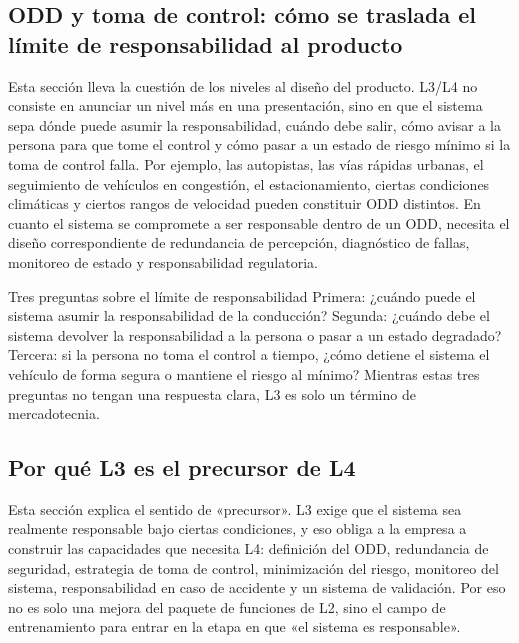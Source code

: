 \documentclass[a4paper]{article}
\begin{document}
\subsection{ODD y toma de control: cómo se traslada el límite de responsabilidad al producto}

Esta sección lleva la cuestión de los niveles al diseño del producto. L3/L4 no consiste en anunciar un nivel más en una presentación, sino en que el sistema sepa dónde puede asumir la responsabilidad, cuándo debe salir, cómo avisar a la persona para que tome el control y cómo pasar a un estado de riesgo mínimo si la toma de control falla. Por ejemplo, las autopistas, las vías rápidas urbanas, el seguimiento de vehículos en congestión, el estacionamiento, ciertas condiciones climáticas y ciertos rangos de velocidad pueden constituir ODD distintos. En cuanto el sistema se compromete a ser responsable dentro de un ODD, necesita el diseño correspondiente de redundancia de percepción, diagnóstico de fallas, monitoreo de estado y responsabilidad regulatoria.

\begin{importantbox}{Tres preguntas sobre el límite de responsabilidad}
Primera: ¿cuándo puede el sistema asumir la responsabilidad de la conducción? Segunda: ¿cuándo debe el sistema devolver la responsabilidad a la persona o pasar a un estado degradado? Tercera: si la persona no toma el control a tiempo, ¿cómo detiene el sistema el vehículo de forma segura o mantiene el riesgo al mínimo? Mientras estas tres preguntas no tengan una respuesta clara, L3 es solo un término de mercadotecnia.
\end{importantbox}

\subsection{Por qué L3 es el precursor de L4}

Esta sección explica el sentido de «precursor». L3 exige que el sistema sea realmente responsable bajo ciertas condiciones, y eso obliga a la empresa a construir las capacidades que necesita L4: definición del ODD, redundancia de seguridad, estrategia de toma de control, minimización del riesgo, monitoreo del sistema, responsabilidad en caso de accidente y un sistema de validación. Por eso no es solo una mejora del paquete de funciones de L2, sino el campo de entrenamiento para entrar en la etapa en que «el sistema es responsable».
\end{document}
